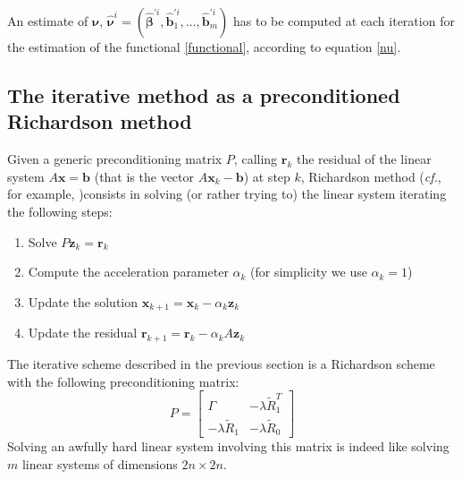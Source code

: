 An estimate of $\bm{\nu}$, $\hat{\bm{\nu}}^i = (\hat{\bm{\beta}}^{\prime i},
	\hat{\bm{b}}_1^{\prime i}, \dots, \hat{\bm{b}}_m^{\prime i})$ has to be
computed at each iteration for the estimation of the functional
\ref{functional}, according to equation \ref{nu}.

\subsection{The iterative method as a preconditioned Richardson method}
Given a generic preconditioning matrix $P$, calling $\bm{r}_k$ the residual of
the linear system $A \bm{x} = \bm{b}$ (that is the vector $A \bm{x}_k -
	\bm{b}$) at step $k$, Richardson method (\textit{cf.}, for example,
\cite{Quarteroni})consists in solving (or rather trying to) the linear system
iterating the following steps:
\begin{enumerate}
	\item Solve $P \bm{z}_k = \bm{r}_k$
	\item Compute the acceleration parameter $\alpha_k$ (for simplicity we use $\alpha_k = 1$)
	\item Update the solution $ \bm{x}_{k+1} = \bm{x}_{k} - \alpha_k \bm{z}_k $
	\item Update the residual $\bm{r}_{k+1} = \bm{r}_{k} - \alpha_k A \bm{z}_k$
\end{enumerate}

The iterative scheme described in the previous section is a Richardson scheme
with the following preconditioning matrix:
\begin{equation}
	\label{precond}
	P=
	\begin{bmatrix}
		\Gamma               & -\lambda \tilde{R}_1^T \\
		-\lambda \tilde{R}_1 & -\lambda \tilde{R}_0
	\end{bmatrix}
\end{equation}
Solving an awfully hard linear system involving this matrix is indeed
like solving $m$ linear systems of dimensions $2n\times 2n$.

